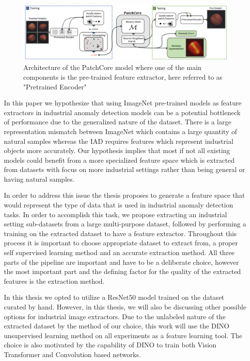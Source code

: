 \begin{figure}[t]
\begin{center}
\includegraphics[width=1.0\linewidth]{Chapter_1/patchcore.png}
\end{center}
\caption{Architecture of the PatchCore\cite{patchcore} model where one of the main components is the pre-trained feature extractor, here referred to as "Pretrained Encoder"}
\label{fig:patchcore}
\end{figure}

In this paper we hypothesize that using ImageNet\cite{imagenet} pre-trained models as feature extractors\cite{pre_trained} in industrial anomaly detection models\cite{pre_trained_iad} can be a potential bottleneck of performance due to the generalized nature of the dataset. There is a large representation mismatch between ImageNet which contains a large quantity of natural samples whereas the IAD\cite{iad_survey} requires features which represent industrial objects more accurately. Our hypothesis implies that most if not all existing models could benefit from a more specialized feature space which is extracted from datasets with focus on more industrial settings rather than being general or having natural samples.

In order to address this issue the thesis proposes to generate a feature space that would represent the type of data that is used in industrial anomaly detection tasks. In order to accomplish this task, we propose extracting an industrial setting sub-datasets from a large multi-purpose dataset\cite{yfcc100m}\cite{laion400m}\cite{laion5b}, followed by performing a training on the extracted dataset to have a feature extractor. Throughout this process it is important to choose appropriate dataset to extract from, a proper self supervised learning method\cite{self_supervised_survey} and an accurate extraction method. All three parts of the pipeline are important and have to be a deliberate choice, however the most important part and the defining factor for the quality of the extracted features is the extraction method.

In this thesis we opted to utilize a ResNet50 model trained on the dataset curated by hand. However, in this thesis, we will also be discussing other possible options for industrial image extractors. Due to the unlabeled nature of the extracted dataset by the method of our choice, this work will use the DINO\cite{dino} unsupervised learning method on all experiments as a feature learning tool. The choice is also motivated by the capability of DINO to train both Vision Transformer and Convolution based networks.


